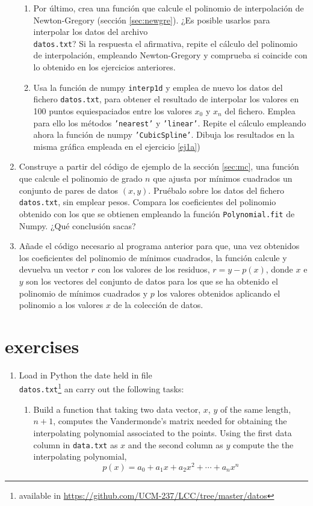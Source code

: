 \begin{paracol}{2}
\begin{enumerate}
\begin{enumerate}
\item Por último, crea una función que calcule el polinomio de interpolación de Newton-Gregory (sección \ref{sec:newgre}). ¿Es posible usarlos para interpolar los datos del archivo\\ \texttt{datos.txt}? Si la respuesta el afirmativa, repite el cálculo del polinomio de interpolación, empleando Newton-Gregory y comprueba si coincide con lo obtenido en los ejercicios anteriores.

\item Usa la función de numpy \texttt{interp1d} y emplea de nuevo los datos del fichero \texttt{datos.txt}, para obtener el resultado de interpolar los valores en 100 puntos equiespaciados entre los valores $x_0$ y $x_{n}$ del fichero.  Emplea para ello los métodos \texttt{'nearest'} y \texttt{'linear'}. Repite el cálculo empleando ahora la función de numpy  \texttt{'CubicSpline'}. Dibuja los resultados en la misma gráfica empleada en el ejercicio  \ref{ej1a})
\end{enumerate}
\item Construye a partir del código de ejemplo de la sección \ref{sec:mc}, una función que calcule el polinomio de grado $n$ que ajusta por mínimos cuadrados un conjunto de pares de datos $(x, y)$. Pruébalo sobre los datos del fichero \texttt{datos.txt}, sin emplear pesos. Compara los coeficientes del polinomio obtenido con los que se obtienen empleando la función \texttt{Polynomial.fit} de Numpy. ¿Qué conclusión sacas?

\item Añade el código necesario al programa anterior para que, una vez obtenidos los coeficientes del polinomio de mínimos cuadrados, la función calcule y devuelva un vector $r$ con los valores de los residuos, $r = y -p(x)$, donde $x$ e $y$ son los vectores del conjunto de datos para los que se ha obtenido el polinomio de mínimos cuadrados y $p$ los valores obtenidos aplicando el polinomio a los valores $x$ de la colección de datos.
\end{enumerate}
\switchcolumn
\section{exercises}
\begin{enumerate}
	\item Load in Python the date held in file\\ \texttt{datos.txt}\footnote{available in \url{https://github.com/UCM-237/LCC/tree/master/datos}} an carry out the following tasks:
\begin{enumerate}
	\item Build a function that taking two data vector, $x$, $y$ of the same length, $n+1$, computes the Vandermonde's matrix needed for obtaining the interpolating polynomial associated to the points. Using the first data column in \texttt{data.txt} as $x$ and the second column as $y$ compute the the interpolating polynomial,
	\begin{equation*}
		p(x)=a_0+a_1x+a_2x^2+\cdots+a_nx^n
	\end{equation*}
	

\end{enumerate}
\end{enumerate}
\end{paracol}
